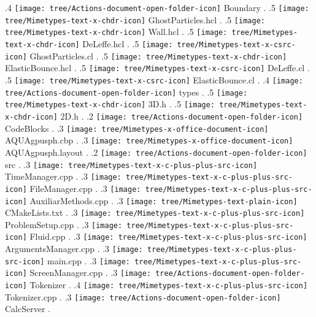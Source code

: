 {.4 { \texttt{[image: tree/Actions-document-open-folder-icon]} Boundary }.
.5 { \texttt{[image: tree/Mimetypes-text-x-chdr-icon]} GhostParticles.hcl }.
.5 { \texttt{[image: tree/Mimetypes-text-x-chdr-icon]} Wall.hcl }.
.5 { \texttt{[image: tree/Mimetypes-text-x-chdr-icon]} DeLeffe.hcl }.
.5 { \texttt{[image: tree/Mimetypes-text-x-csrc-icon]} GhostParticles.cl }.
.5 { \texttt{[image: tree/Mimetypes-text-x-chdr-icon]} ElasticBounce.hcl }.
.5 { \texttt{[image: tree/Mimetypes-text-x-csrc-icon]} DeLeffe.cl }.
.5 { \texttt{[image: tree/Mimetypes-text-x-csrc-icon]} ElasticBounce.cl }.
.4 { \texttt{[image: tree/Actions-document-open-folder-icon]} types }.
.5 { \texttt{[image: tree/Mimetypes-text-x-chdr-icon]} 3D.h }.
.5 { \texttt{[image: tree/Mimetypes-text-x-chdr-icon]} 2D.h }.
.2 { \texttt{[image: tree/Actions-document-open-folder-icon]} CodeBlocks }.
.3 { \texttt{[image: tree/Mimetypes-x-office-document-icon]} AQUAgpusph.cbp }.
.3 { \texttt{[image: tree/Mimetypes-x-office-document-icon]} AQUAgpusph.layout }.
.2 { \texttt{[image: tree/Actions-document-open-folder-icon]} src }.
.3 { \texttt{[image: tree/Mimetypes-text-x-c-plus-plus-src-icon]} TimeManager.cpp }.
.3 { \texttt{[image: tree/Mimetypes-text-x-c-plus-plus-src-icon]} FileManager.cpp }.
.3 { \texttt{[image: tree/Mimetypes-text-x-c-plus-plus-src-icon]} AuxiliarMethods.cpp }.
.3 { \texttt{[image: tree/Mimetypes-text-plain-icon]} CMakeLists.txt }.
.3 { \texttt{[image: tree/Mimetypes-text-x-c-plus-plus-src-icon]} ProblemSetup.cpp }.
.3 { \texttt{[image: tree/Mimetypes-text-x-c-plus-plus-src-icon]} Fluid.cpp }.
.3 { \texttt{[image: tree/Mimetypes-text-x-c-plus-plus-src-icon]} ArgumentsManager.cpp }.
.3 { \texttt{[image: tree/Mimetypes-text-x-c-plus-plus-src-icon]} main.cpp }.
.3 { \texttt{[image: tree/Mimetypes-text-x-c-plus-plus-src-icon]} ScreenManager.cpp }.
.3 { \texttt{[image: tree/Actions-document-open-folder-icon]} Tokenizer }.
.4 { \texttt{[image: tree/Mimetypes-text-x-c-plus-plus-src-icon]} Tokenizer.cpp }.
.3 { \texttt{[image: tree/Actions-document-open-folder-icon]} CalcServer }.
}
